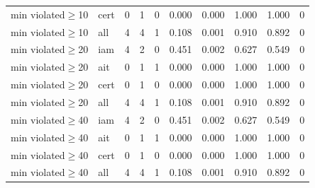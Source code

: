 \begin{table}[!ht]
{\begin{tabular}{llllllllll}
min violated$\ge$10 & cert & 0 & 1 & 0 & 0.000 & 0.000 & 1.000 & 1.000 & 0 \\
min violated$\ge$10 & all & 4 & 4 & 1 & 0.108 & 0.001 & 0.910 & 0.892 & 0 \\
min violated$\ge$20 & iam & 4 & 2 & 0 & 0.451 & 0.002 & 0.627 & 0.549 & 0 \\
min violated$\ge$20 & ait & 0 & 1 & 1 & 0.000 & 0.000 & 1.000 & 1.000 & 0 \\
min violated$\ge$20 & cert & 0 & 1 & 0 & 0.000 & 0.000 & 1.000 & 1.000 & 0 \\
min violated$\ge$20 & all & 4 & 4 & 1 & 0.108 & 0.001 & 0.910 & 0.892 & 0 \\
min violated$\ge$40 & iam & 4 & 2 & 0 & 0.451 & 0.002 & 0.627 & 0.549 & 0 \\
min violated$\ge$40 & ait & 0 & 1 & 1 & 0.000 & 0.000 & 1.000 & 1.000 & 0 \\
min violated$\ge$40 & cert & 0 & 1 & 0 & 0.000 & 0.000 & 1.000 & 1.000 & 0 \\
min violated$\ge$40 & all & 4 & 4 & 1 & 0.108 & 0.001 & 0.910 & 0.892 & 0 \\
\bottomrule
\end{tabular}}
\end{table}
